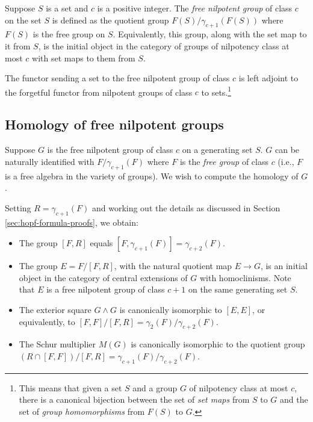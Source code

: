 \documentclass{ucetd}
\begin{document}
\begin{definer}
  Suppose $S$ is a set and $c$ is a positive integer. The {\em free
    nilpotent group} of class $c$ on the set $S$ is defined as the
  quotient group $F(S)/\gamma_{c+1}(F(S))$ where $F(S)$ is the free
  group on $S$. Equivalently, this group, along with the set map to it
  from $S$, is the initial object in the category of groups of
  nilpotency class at most $c$ with set maps to them from $S$.

  The functor sending a set to the free nilpotent group of class $c$
  is left adjoint to the forgetful functor from nilpotent groups of
  class $c$ to sets.\footnote{This means that given a set $S$ and a
    group $G$ of nilpotency class at most $c$, there is a canonical
    bijection between the set of {\em set maps} from $S$ to $G$ and
    the set of {\em group homomorphisms} from $F(S)$ to $G$.}
\end{definer}

\subsection{Homology of free nilpotent groups}

Suppose $G$ is the free nilpotent group of class $c$ on a generating
set $S$. $G$ can be naturally identified with $F/\gamma_{c+1}(F)$
where $F$ is the {\em free group} of class $c$ (i.e., $F$ is a free
algebra in the variety of groups). We wish to compute the homology of
$G$.

Setting $R = \gamma_{c+1}(F)$ and working out the details as discussed
in Section \ref{sec:hopf-formula-proofs}, we obtain:

\begin{itemize}
\item The group $[F,R]$ equals $[F,\gamma_{c+1}(F)] = \gamma_{c+2}(F)$.
\item The group $E = F/[F,R]$, with the natural quotient map $E \to
  G$, is an initial object in the category of central extensions of
  $G$ with homoclinisms. Note that $E$ is a free nilpotent group of
  class $c + 1$ on the same generating set $S$.
\item The exterior square $G \wedge G$ is canonically isomorphic to
  $[E,E]$, or equivalently, to $[F,F]/[F,R] =
  \gamma_2(F)/\gamma_{c+2}(F)$.
\item The Schur multiplier $M(G)$ is canonically isomorphic to the
  quotient group $(R \cap [F,F])/[F,R] =
  \gamma_{c+1}(F)/\gamma_{c+2}(F)$.
\end{itemize}
\end{document}
